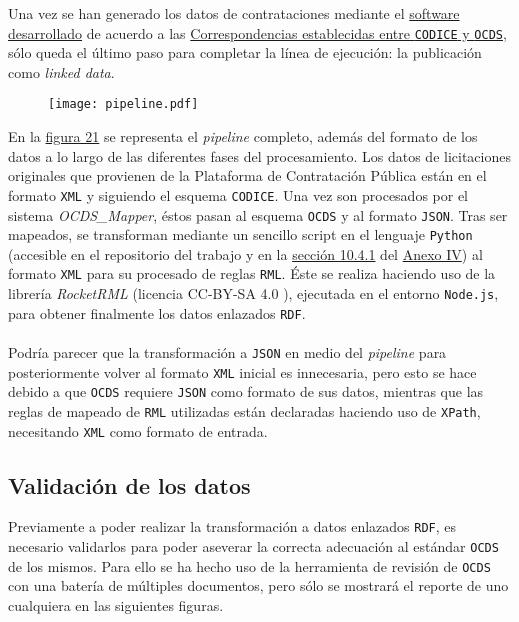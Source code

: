     
    Una vez se han generado los datos de contrataciones mediante el \hyperref[sec:software]{software desarrollado} de acuerdo a las \hyperref[sec:correspondencias]{Correspondencias establecidas entre \texttt{CODICE} y \texttt{OCDS}}, sólo queda el último paso para completar la línea de ejecución: la publicación como \textit{linked data}.

    \begin{figure}[h]
        \centering
        \texttt{[image: pipeline.pdf]}
        \label{fig:pipeline}
    \end{figure}
    
    \noindent En la \hyperref[fig:pipeline]{figura 21} se representa el \textit{pipeline} completo, además del formato de los datos a lo largo de las diferentes fases del procesamiento. Los datos de licitaciones originales que provienen de la Plataforma de Contratación Pública están en el formato \texttt{XML} y siguiendo el esquema \texttt{CODICE}. Una vez son procesados por el sistema \textit{OCDS\_Mapper}, éstos pasan al esquema \texttt{OCDS} y al formato \texttt{JSON}. Tras ser mapeados, se transforman mediante un sencillo script en el lenguaje \texttt{Python} (accesible en el repositorio del trabajo \cite{SCRIPTGEN} y en la \hyperref[subsubsec:py1]{sección 10.4.1} del \hyperref[annex:scriptspy]{Anexo IV}) al formato \texttt{XML} para su procesado de reglas \texttt{RML}. Éste se realiza haciendo uso de la librería \textit{RocketRML} \cite{ROCKETRML} (licencia CC-BY-SA 4.0 \cite{LICCC}), ejecutada en el entorno \texttt{Node.js}, para obtener finalmente los datos enlazados \texttt{RDF}.
    \\ \\
    Podría parecer que la transformación a \texttt{JSON} en medio del \textit{pipeline} para posteriormente volver al formato \texttt{XML} inicial es innecesaria, pero esto se hace debido a que \texttt{OCDS} requiere \texttt{JSON} como formato de sus datos, mientras que las reglas de mapeado de \texttt{RML} utilizadas están declaradas haciendo uso de \texttt{XPath}, necesitando \texttt{XML} como formato de entrada.
    
    \subsection{Validación de los datos}
        Previamente a poder realizar la transformación a datos enlazados \texttt{RDF}, es necesario validarlos para poder aseverar la correcta adecuación al estándar \texttt{OCDS} de los mismos. Para ello se ha hecho uso de la herramienta de revisión de \texttt{OCDS} \cite{OCDSREVIEWTOOL} con una batería de múltiples documentos, pero sólo se mostrará el reporte de uno cualquiera en las siguientes figuras.
        
